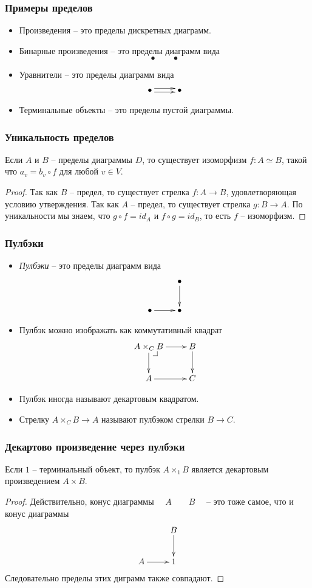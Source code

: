 \documentclass{beamer}
\makeatletter
\theoremstyle{definition}
\newcommand{\pb}[1][dr]{\save*!/#1-1.2pc/#1:(-1,1)@^{|-}\restore}
\makeatother
\begin{document}
\begin{frame}
\frametitle{Примеры пределов}
\begin{itemize}
\item Произведения -- это пределы дискретных диаграмм.
\item Бинарные произведения -- это пределы диаграмм вида \[ \bullet \qquad \bullet \]
\item Уравнители -- это пределы диаграмм вида
\[ \xymatrix{ \bullet \ar@<-.5ex>[r] \ar@<.5ex>[r] & \bullet } \]
\item Терминальные объекты -- это пределы пустой диаграммы.
\end{itemize}
\end{frame}

\begin{frame}
\frametitle{Уникальность пределов}
\begin{prop}
Если $A$ и $B$ -- пределы диаграммы $D$, то существует изоморфизм $f : A \simeq B$, такой что $a_v = b_v \circ f$ для любой $v \in V$.
\end{prop}
\begin{proof}
Так как $B$ -- предел, то существует стрелка $f : A \to B$, удовлетворяющая условию утверждения.
Так как $A$ -- предел, то существует стрелка $g : B \to A$.
По уникальности мы знаем, что $g \circ f = id_A$ и $f \circ g = id_B$, то есть $f$ -- изоморфизм.
\end{proof}
\end{frame}

\begin{frame}
\frametitle{Пулбэки}
\begin{itemize}
\item \emph{Пулбэки} -- это пределы диаграмм вида
\[ \xymatrix{                & \bullet \ar[d] \\
              \bullet \ar[r] & \bullet
            } \]
\item Пулбэк можно изображать как коммутативный квадрат
\[ \xymatrix{ A \times_C B \ar[d] \ar[r] \pb & B \ar[d] \\
              A \ar[r]                       & C
            } \]
\item Пулбэк иногда называют декартовым квадратом.
\item Стрелку $A \times_C B \to A$ называют пулбэком стрелки $B \to C$.
\end{itemize}
\end{frame}

\begin{frame}
\frametitle{Декартово произведение через пулбэки}
\begin{prop}
Если $1$ -- терминальный объект, то пулбэк $A \times_1 B$ является декартовым произведением $A \times B$.
\end{prop}
\begin{proof}
Действительно, конус диаграммы $\quad A \qquad B \quad$ -- это тоже самое, что и конус диаграммы 
\[ \xymatrix{          & B \ar[d] \\
              A \ar[r] & 1
            } \]
Следовательно пределы этих диграмм также совпадают.
\end{proof}
\end{frame}
\end{document}
